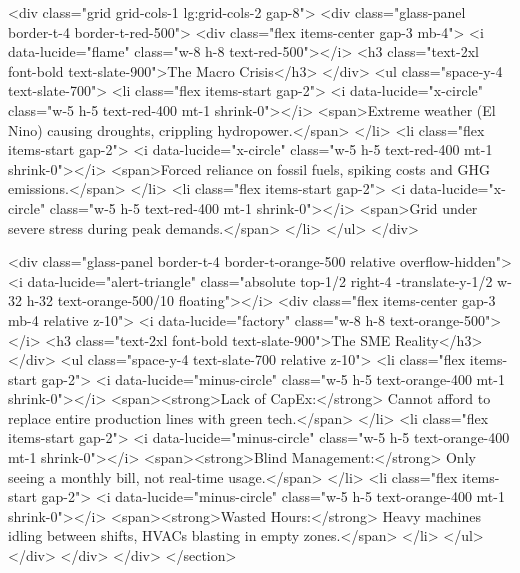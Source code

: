                 <div class="grid grid-cols-1 lg:grid-cols-2 gap-8">
                    <div class="glass-panel border-t-4 border-t-red-500">
                        <div class="flex items-center gap-3 mb-4">
                            <i data-lucide="flame" class="w-8 h-8 text-red-500"></i>
                            <h3 class="text-2xl font-bold text-slate-900">The Macro Crisis</h3>
                        </div>
                        <ul class="space-y-4 text-slate-700">
                            <li class="flex items-start gap-2">
                                <i data-lucide="x-circle" class="w-5 h-5 text-red-400 mt-1 shrink-0"></i>
                                <span>Extreme weather (El Nino) causing droughts, crippling hydropower.</span>
                            </li>
                            <li class="flex items-start gap-2">
                                <i data-lucide="x-circle" class="w-5 h-5 text-red-400 mt-1 shrink-0"></i>
                                <span>Forced reliance on fossil fuels, spiking costs and GHG emissions.</span>
                            </li>
                            <li class="flex items-start gap-2">
                                <i data-lucide="x-circle" class="w-5 h-5 text-red-400 mt-1 shrink-0"></i>
                                <span>Grid under severe stress during peak demands.</span>
                            </li>
                        </ul>
                    </div>

                    <div class="glass-panel border-t-4 border-t-orange-500 relative overflow-hidden">
                        <i data-lucide="alert-triangle" class="absolute top-1/2 right-4 -translate-y-1/2 w-32 h-32 text-orange-500/10 floating"></i>
                        <div class="flex items-center gap-3 mb-4 relative z-10">
                            <i data-lucide="factory" class="w-8 h-8 text-orange-500"></i>
                            <h3 class="text-2xl font-bold text-slate-900">The SME Reality</h3>
                        </div>
                        <ul class="space-y-4 text-slate-700 relative z-10">
                            <li class="flex items-start gap-2">
                                <i data-lucide="minus-circle" class="w-5 h-5 text-orange-400 mt-1 shrink-0"></i>
                                <span><strong>Lack of CapEx:</strong> Cannot afford to replace entire production lines with green tech.</span>
                            </li>
                            <li class="flex items-start gap-2">
                                <i data-lucide="minus-circle" class="w-5 h-5 text-orange-400 mt-1 shrink-0"></i>
                                <span><strong>Blind Management:</strong> Only seeing a monthly bill, not real-time usage.</span>
                            </li>
                            <li class="flex items-start gap-2">
                                <i data-lucide="minus-circle" class="w-5 h-5 text-orange-400 mt-1 shrink-0"></i>
                                <span><strong>Wasted Hours:</strong> Heavy machines idling between shifts, HVACs blasting in empty zones.</span>
                            </li>
                        </ul>
                    </div>
                </div>
            </div>
        </section>


